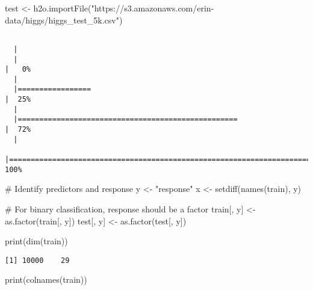 \documentclass[
  letterpaper,
  DIV=11,
  numbers=noendperiod]{scrartcl}
\newenvironment{Shaded}{\begin{snugshade}}{\end{snugshade}}
\newcommand{\CommentTok}[1]{\textcolor[rgb]{0.37,0.37,0.37}{#1}}
\newcommand{\FunctionTok}[1]{\textcolor[rgb]{0.28,0.35,0.67}{#1}}
\newcommand{\NormalTok}[1]{\textcolor[rgb]{0.00,0.23,0.31}{#1}}
\newcommand{\OtherTok}[1]{\textcolor[rgb]{0.00,0.23,0.31}{#1}}
\newcommand{\StringTok}[1]{\textcolor[rgb]{0.13,0.47,0.30}{#1}}
\begin{document}
\begin{Shaded}
\begin{Highlighting}[]
\NormalTok{test }\OtherTok{\textless{}{-}} \FunctionTok{h2o.importFile}\NormalTok{(}\StringTok{"https://s3.amazonaws.com/erin{-}data/higgs/higgs\_test\_5k.csv"}\NormalTok{)}
\end{Highlighting}
\end{Shaded}

\begin{verbatim}

  |                                                                            
  |                                                                      |   0%
  |                                                                            
  |=================                                                     |  25%
  |                                                                            
  |===================================================                   |  72%
  |                                                                            
  |======================================================================| 100%
\end{verbatim}

\begin{Shaded}
\begin{Highlighting}[]
\CommentTok{\# Identify predictors and response}
\NormalTok{y }\OtherTok{\textless{}{-}} \StringTok{"response"}
\NormalTok{x }\OtherTok{\textless{}{-}} \FunctionTok{setdiff}\NormalTok{(}\FunctionTok{names}\NormalTok{(train), y)}

\CommentTok{\# For binary classification, response should be a factor}
\NormalTok{train[, y] }\OtherTok{\textless{}{-}} \FunctionTok{as.factor}\NormalTok{(train[, y])}
\NormalTok{test[, y] }\OtherTok{\textless{}{-}} \FunctionTok{as.factor}\NormalTok{(test[, y])}

\FunctionTok{print}\NormalTok{(}\FunctionTok{dim}\NormalTok{(train))}
\end{Highlighting}
\end{Shaded}

\begin{verbatim}
[1] 10000    29
\end{verbatim}

\begin{Shaded}
\begin{Highlighting}[]
\FunctionTok{print}\NormalTok{(}\FunctionTok{colnames}\NormalTok{(train))}
\end{Highlighting}
\end{Shaded}
\end{document}
